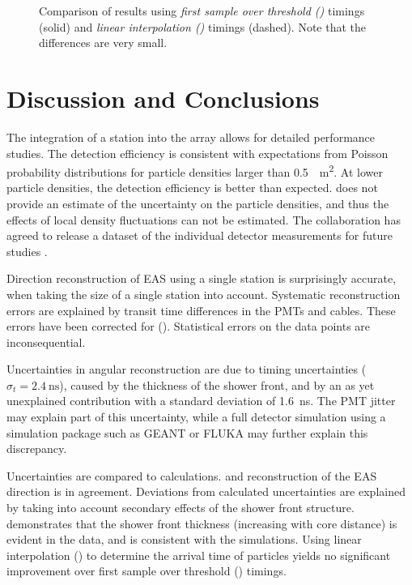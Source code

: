 \begin{figure}
\centering

\caption{Comparison of results using \emph{first sample over threshold
()} timings (solid) and \emph{linear interpolation
()} timings (dashed).  Note that the differences are
very small.}
\label{fig:results-fsot-lint}
\end{figure}


\section{Discussion and Conclusions}

The integration of a \hisparc station into the \kascade array allows for
detailed performance studies.
The detection efficiency is consistent with expectations from Poisson
probability distributions for particle densities larger than
\SI{0.5}{\per\square\meter}.
At lower particle densities, the detection efficiency is better than expected.
\kascade does not provide an estimate of the uncertainty on the particle
densities, and thus the effects of local density fluctuations can not be
estimated. The \kascade collaboration has agreed to release a dataset of the
individual \kascade detector measurements for future studies
\cite{Haungs:2012-data}.

Direction reconstruction of EAS using a single \hisparc station is surprisingly
accurate, when taking the size of a single station into account.
Systematic reconstruction errors are explained by transit time differences
in the PMTs and cables. These errors have been corrected for
(). Statistical errors on the data points are
inconsequential.

Uncertainties in angular reconstruction are due to timing uncertainties
($\sigma_t = \SI{2.4}{\nano\second}$), caused by the thickness of the shower
front, and by an as yet unexplained contribution with a standard deviation of
\SI{1.6}{\nano\second}. The PMT jitter may explain part of this uncertainty,
while a full detector simulation using a simulation package such as GEANT or
FLUKA may further explain this discrepancy.

Uncertainties are compared to calculations. \hisparc and \kascade reconstruction
of the EAS direction is in agreement.
Deviations from calculated uncertainties are explained by taking into account
secondary effects of the shower front structure.
 demonstrates that the shower front
thickness (increasing with core distance) is evident in the \hisparc data, and
is consistent with the simulations.
Using linear interpolation () to determine the arrival time of
particles yields no significant improvement over first sample over threshold
() timings.

